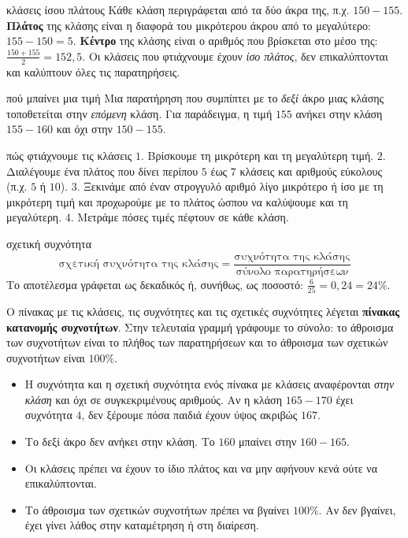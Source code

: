 \begin{orismos}{κλάσεις ίσου πλάτους}
Κάθε κλάση περιγράφεται από τα δύο άκρα της, π.χ. $150-155$. \textbf{Πλάτος} της κλάσης είναι η διαφορά του μικρότερου άκρου από το μεγαλύτερο: $155-150=5$. \textbf{Κέντρο} της κλάσης είναι ο αριθμός που βρίσκεται στο μέσο της: $\frac{150+155}{2}=152{,}5$. Οι κλάσεις που φτιάχνουμε έχουν \emph{ίσο πλάτος}, δεν επικαλύπτονται και καλύπτουν όλες τις παρατηρήσεις.
\end{orismos}

\begin{kanonas}{πού μπαίνει μια τιμή}
Μια παρατήρηση που συμπίπτει με το \emph{δεξί} άκρο μιας κλάσης τοποθετείται στην \emph{επόμενη} κλάση. Για παράδειγμα, η τιμή $155$ ανήκει στην κλάση $155-160$ και όχι στην $150-155$.
\end{kanonas}

\begin{kanonas}{πώς φτιάχνουμε τις κλάσεις}
$1.$ Βρίσκουμε τη μικρότερη και τη μεγαλύτερη τιμή. $2.$ Διαλέγουμε ένα πλάτος που δίνει περίπου $5$ έως $7$ κλάσεις και αριθμούς εύκολους (π.χ. $5$ ή $10$). $3.$ Ξεκινάμε από έναν στρογγυλό αριθμό λίγο μικρότερο ή ίσο με τη μικρότερη τιμή και προχωρούμε με το πλάτος ώσπου να καλύψουμε και τη μεγαλύτερη. $4.$ Μετράμε πόσες τιμές πέφτουν σε κάθε κλάση.
\end{kanonas}

\begin{kanonas}{σχετική συχνότητα}
$$\text{σχετική συχνότητα της κλάσης}=\frac{\text{συχνότητα της κλάσης}}{\text{σύνολο παρατηρήσεων}}$$
Το αποτέλεσμα γράφεται ως δεκαδικός ή, συνήθως, ως ποσοστό: $\frac{6}{25}=0{,}24=24\%$.
\end{kanonas}

Ο πίνακας με τις κλάσεις, τις συχνότητες και τις σχετικές συχνότητες λέγεται \textbf{πίνακας κατανομής συχνοτήτων}. Στην τελευταία γραμμή γράφουμε το σύνολο: το άθροισμα των συχνοτήτων είναι το πλήθος των παρατηρήσεων και το άθροισμα των σχετικών συχνοτήτων είναι $100\%$.

\begin{prosoxi}
\begin{itemize}[leftmargin=1.2em,itemsep=0.3ex,topsep=2pt]
\item Η συχνότητα και η σχετική συχνότητα ενός πίνακα με κλάσεις αναφέρονται \emph{στην κλάση} και όχι σε συγκεκριμένους αριθμούς. Αν η κλάση $165-170$ έχει συχνότητα $4$, δεν ξέρουμε πόσα παιδιά έχουν ύψος ακριβώς $167$.
\item Το δεξί άκρο δεν ανήκει στην κλάση. Το $160$ μπαίνει στην $160-165$.
\item Οι κλάσεις πρέπει να έχουν το ίδιο πλάτος και να μην αφήνουν κενά ούτε να επικαλύπτονται.
\item Το άθροισμα των σχετικών συχνοτήτων πρέπει να βγαίνει $100\%$. Αν δεν βγαίνει, έχει γίνει λάθος στην καταμέτρηση ή στη διαίρεση.
\end{itemize}
\end{prosoxi}

